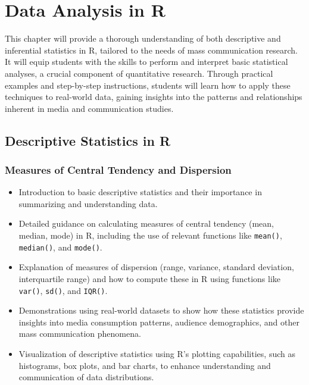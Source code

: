 \documentclass[
]{book}
\begin{document}
\hypertarget{data-analysis-in-r}{%
\chapter*{Data Analysis in R}\label{data-analysis-in-r}}

This chapter will provide a thorough understanding of both descriptive and inferential statistics in R, tailored to the needs of mass communication research. It will equip students with the skills to perform and interpret basic statistical analyses, a crucial component of quantitative research. Through practical examples and step-by-step instructions, students will learn how to apply these techniques to real-world data, gaining insights into the patterns and relationships inherent in media and communication studies.

\hypertarget{descriptive-statistics-in-r}{%
\section*{Descriptive Statistics in R}\label{descriptive-statistics-in-r}}

\hypertarget{measures-of-central-tendency-and-dispersion}{%
\subsection*{Measures of Central Tendency and Dispersion}\label{measures-of-central-tendency-and-dispersion}}

\begin{itemize}
\item
  Introduction to basic descriptive statistics and their importance in summarizing and understanding data.
\item
  Detailed guidance on calculating measures of central tendency (mean, median, mode) in R, including the use of relevant functions like \texttt{mean()}, \texttt{median()}, and \texttt{mode()}.
\item
  Explanation of measures of dispersion (range, variance, standard deviation, interquartile range) and how to compute these in R using functions like \texttt{var()}, \texttt{sd()}, and \texttt{IQR()}.
\item
  Demonstrations using real-world datasets to show how these statistics provide insights into media consumption patterns, audience demographics, and other mass communication phenomena.
\item
  Visualization of descriptive statistics using R's plotting capabilities, such as histograms, box plots, and bar charts, to enhance understanding and communication of data distributions.
\end{itemize}
\end{document}
